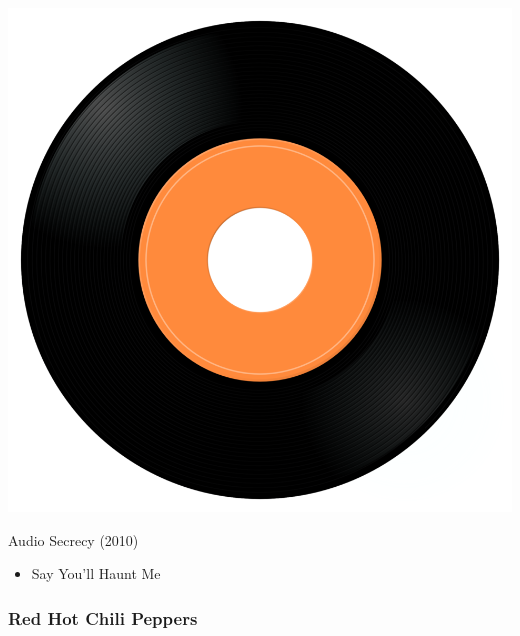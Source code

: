 \begin{minipage}[t]{0.25\textwidth}
\captionsetup{type=figure}
\includegraphics[width=\textwidth]{Images/cover.png}
\caption*{Audio Secrecy (2010)}
\end{minipage}
\begin{minipage}[t]{0.25\textwidth}\vspace{0pt}
\begin{itemize}[nosep,leftmargin=1em,labelwidth=*,align=left]
	\setlength{\itemsep}{0pt}
	\item Say You'll Haunt Me
\end{itemize}
\end{minipage}

\subsubsection{Red Hot Chili Peppers}


